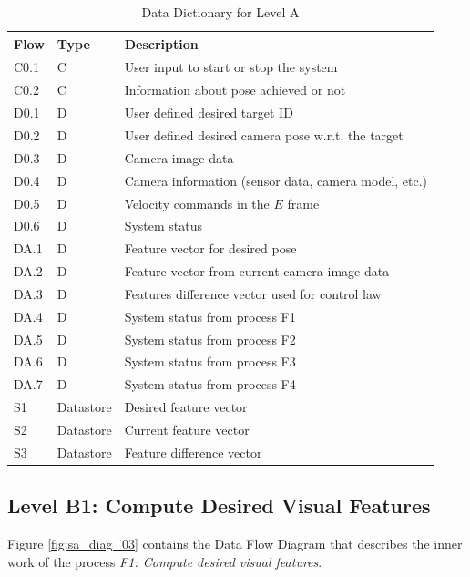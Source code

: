 \begin{table}[!htb]
	\caption{Data Dictionary for Level A}
	\label{tab:DD-LA}
	\centering
	\begin{tabular}{lll}
		\toprule
		Flow & Type & Description \\
		\midrule
		C0.1 & C & User input to start or stop the system \\
		C0.2 & C & Information about pose achieved or not \\
		D0.1 & D & User defined desired target ID \\
		D0.2 & D & User defined desired camera pose w.r.t. the target \\
		D0.3 & D & Camera image data \\
		D0.4 & D & Camera information (sensor data, camera model, etc.) \\
		D0.5 & D & Velocity commands in the $E$ frame \\
		D0.6 & D & System status \\
		\midrule
		DA.1 & D & Feature vector for desired pose \\
		DA.2 & D & Feature vector from current camera image data \\
		DA.3 & D & Features difference vector used for control law \\
		DA.4 & D & System status from process F1 \\
		DA.5 & D & System status from process F2 \\
		DA.6 & D & System status from process F3 \\
		DA.7 & D & System status from process F4 \\
		\midrule
		S1 & Datastore & Desired feature vector \\
		S2 & Datastore & Current feature vector \\
		S3 & Datastore & Feature difference vector \\
		\bottomrule
	\end{tabular}
\end{table}

\pagebreak

\subsection{Level B1: Compute Desired Visual Features}
\label{sec:level-B1}


Figure \ref{fig:sa_diag_03} contains the Data Flow Diagram that describes the inner work of the process \textit{F1: Compute desired visual features}.

